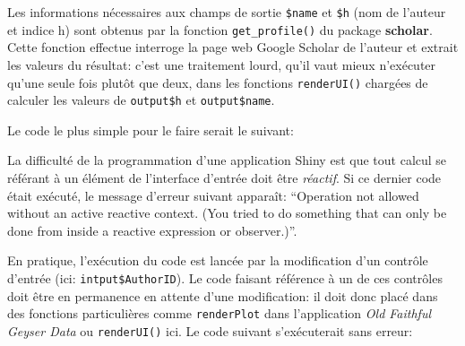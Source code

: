\documentclass[
  11pt,
  french,
  a4paper,
  extrafontsizes,onecolumn,openright
  ]{memoir}
\newenvironment{Shaded}{\begin{snugshade}}{\end{snugshade}}
\newcommand{\CommentTok}[1]{\textcolor[rgb]{0.56,0.35,0.01}{\textit{#1}}}
\newcommand{\FunctionTok}[1]{\textcolor[rgb]{0.00,0.00,0.00}{#1}}
\newcommand{\NormalTok}[1]{#1}
\newcommand{\OtherTok}[1]{\textcolor[rgb]{0.56,0.35,0.01}{#1}}
\newcommand{\SpecialCharTok}[1]{\textcolor[rgb]{0.00,0.00,0.00}{#1}}
\begin{document}
\normalsize

Les informations nécessaires aux champs de sortie \texttt{\$name} et \texttt{\$h} (nom de l'auteur et indice h) sont obtenus par la fonction \texttt{get\_profile()} du package \textbf{scholar}.
Cette fonction effectue interroge la page web Google Scholar de l'auteur et extrait les valeurs du résultat: c'est une traitement lourd, qu'il vaut mieux n'exécuter qu'une seule fois plutôt que deux, dans les fonctions \texttt{renderUI()} chargées de calculer les valeurs de \texttt{output\$h} et \texttt{output\$name}.

Le code le plus simple pour le faire serait le suivant:

\scriptsize

\begin{Shaded}
\end{Shaded}

\normalsize

La difficulté de la programmation d'une application Shiny est que tout calcul se référant à un élément de l'interface d'entrée doit être \emph{réactif}.
Si ce dernier code était exécuté, le message d'erreur suivant apparaît:
``Operation not allowed without an active reactive context. (You tried to do something that can only be done from inside a reactive expression or observer.)''.

En pratique, l'exécution du code est lancée par la modification d'un contrôle d'entrée (ici: \texttt{intput\$AuthorID}).
Le code faisant référence à un de ces contrôles doit être en permanence en attente d'une modification: il doit donc placé dans des fonctions particulières comme \texttt{renderPlot} dans l'application \emph{Old Faithful Geyser Data} ou \texttt{renderUI()} ici.
Le code suivant s'exécuterait sans erreur:

\scriptsize

\begin{Shaded}
\end{Shaded}
\end{document}
